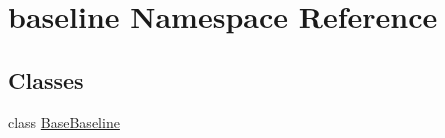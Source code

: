 \hypertarget{namespacebaseline}{}\section{baseline Namespace Reference}
\label{namespacebaseline}
\subsection*{Classes}
\begin{DoxyCompactItemize}
\item 
class \hyperlink{classbaseline_1_1_base_baseline}{Base\+Baseline}
\end{DoxyCompactItemize}

